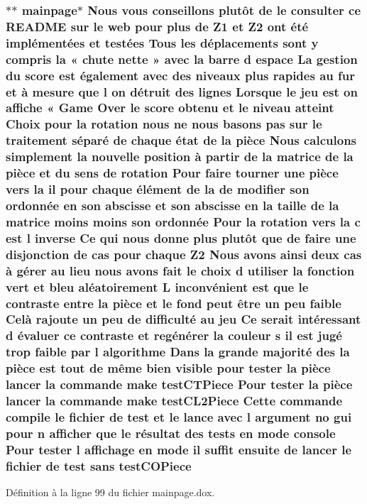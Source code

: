 \hypertarget{mainpage_8dox_ada86c604176046aa16d8c372aeb59204}{
\subsubsection[{test\-C\-O\-Piece}]{\setlength{\rightskip}{0pt plus 5cm}$\ast$$\ast$ mainpage$\ast$ Nous vous conseillons plutô{\bf t} {\bf de} le consulter ce R\-E\-A\-D\-M\-E sur le web pour plus {\bf de} {\bf Z1} et Z2 ont é{\bf t}é implémentées et testées Tous les déplacements sont {\bf y} compris la « chute nette » avec la barre d espace La gestion du score est également avec des niveaux plus rapides au fur et à mesure que l on détruit des lignes Lorsque le jeu est on affiche « Game Over le score obtenu et le niveau atteint Choix pour la rotation nous ne nous basons pas sur le traitement {\bf s}éparé {\bf de} chaque état {\bf de} la pièce Nous calculons simplement la nouvelle position à partir {\bf de} la {\bf matrice} {\bf de} la pièce et du {\bf sens} {\bf de} rotation Pour faire tourner une pièce vers la il pour chaque élément {\bf de} la {\bf de} modifier son ordonnée en son abscisse et son abscisse en la taille {\bf de} la {\bf matrice} moins moins son ordonnée Pour la rotation vers la {\bf c} est l inverse Ce qui nous donne plus plutô{\bf t} que {\bf de} faire une disjonction {\bf de} {\bf cas} pour chaque Z2 Nous avons ainsi deux {\bf cas} à {\bf g}érer au lieu nous avons fait le choix d utiliser la fonction vert et bleu aléatoirement L inconvénient est que le contraste entre la pièce et le fond peut être un peu faible Celà rajoute un peu {\bf de} difficulté au jeu Ce serait intéressant d évaluer ce contraste et regé{\bf n}érer la couleur {\bf s} il est jugé trop faible par l algorithme Dans la grande majorité des la pièce est tout {\bf de} {\bf m}ême bien visible pour tester la pièce lancer la commande make test\-C\-T\-Piece Pour tester la pièce lancer la commande make test\-C\-L2\-Piece Cette commande compile le fichier {\bf de} test et le lance avec l argument no gui pour {\bf n} afficher que le {\bf r}ésultat des tests en {\bf mode} {\bf console} Pour tester l affichage en {\bf mode} il {\bf suffit} ensuite {\bf de} lancer le fichier {\bf de} test sans test\-C\-O\-Piece}}\label{mainpage_8dox_ada86c604176046aa16d8c372aeb59204}


Définition à la ligne 99 du fichier mainpage.\-dox.

